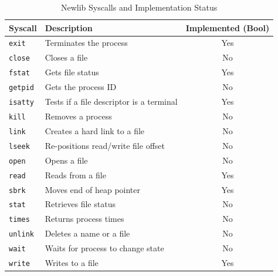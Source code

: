 \documentclass[12pt,a4paper,english
]{tunithesis}
\begin{document}
\begin{table}[htbp]
\centering
\begin{tabular}{|l|l|c|}
\hline
\textbf{Syscall}       & \textbf{Description}               & \textbf{Implemented (Bool)} \\ \hline
\texttt{exit}         & Terminates the process             & Yes                       \\ \hline
\texttt{close}         & Closes a file                      & No                       \\ \hline
\texttt{fstat}         & Gets file status                   & Yes                       \\ \hline
\texttt{getpid}        & Gets the process ID                & No                       \\ \hline
\texttt{isatty}        & Tests if a file descriptor is a terminal & Yes                 \\ \hline
\texttt{kill}          & Removes a process                    & No                       \\ \hline
\texttt{link}          & Creates a hard link to a file      & No                       \\ \hline
\texttt{lseek}         & Re-positions read/write file offset & No                       \\ \hline
\texttt{open}          & Opens a file                       & No                       \\ \hline
\texttt{read}          & Reads from a file                  & Yes                       \\ \hline
\texttt{sbrk}          & Moves end of heap pointer          & Yes                       \\ \hline
\texttt{stat}          & Retrieves file status              & No                       \\ \hline
\texttt{times}         & Returns process times              & No                       \\ \hline
\texttt{unlink}        & Deletes a name or a file           & No                       \\ \hline
\texttt{wait}          & Waits for process to change state  & No                       \\ \hline
\texttt{write}         & Writes to a file                   & Yes                       \\ \hline
\end{tabular}
\caption{Newlib Syscalls and Implementation Status}
\label{tab:newlib_syscalls}
\end{table}
\end{document}
